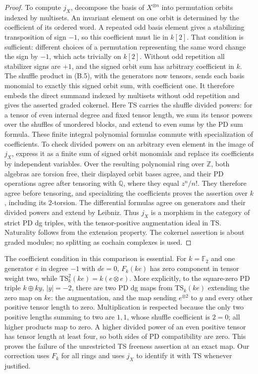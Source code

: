 \begin{proof}
To compute $j_X$, decompose the basis of $X^{\otimes n}$ into permutation
orbits indexed by multisets.  An invariant element on one orbit is
determined by the coefficient of its ordered word.  A repeated odd basis
element gives a stabilizing transposition of sign $-1$, so this coefficient
must lie in $k[2]$.  That condition is sufficient: different choices of a
permutation representing the same word change the sign by $-1$, which
acts trivially on $k[2]$.  Without odd repetition all stabilizer signs are
$+1$, and the signed orbit sum has arbitrary coefficient in $k$.
The shuffle product in \textup{(B.5)}, with the generators now tensors,
sends each basis monomial to exactly this signed orbit sum, with
coefficient one.  It therefore embeds the direct summand indexed by
multisets without odd repetition and gives the asserted graded cokernel.
Here TS carries the shuffle divided powers: for a tensor of even
internal degree and fixed tensor length, we sum its tensor powers over
the shuffles of unordered blocks, and extend to even sums by the PD
sum formula.  These finite integral polynomial formulas commute with
specialization of coefficients.  To check divided powers on an arbitrary
even element in the image of $j_X$, express it as a finite sum of signed
orbit monomials and replace its coefficients by independent variables.
Over the resulting polynomial ring over $\mathbb Z$, both algebras are
torsion free, their displayed orbit bases agree, and their PD operations
agree after tensoring with $\mathbb Q$, where they equal $z^n/n!$.
They therefore agree before tensoring, and specializing the coefficients
proves the assertion over $k$, including its $2$-torsion.
The differential formulas agree on generators and their divided powers
and extend by Leibniz.  Thus $j_X$ is a morphism in the category of
strict PD dg triples, with the tensor-positive augmentation ideal in TS.
Naturality follows from the extension property.
The cokernel assertion is about graded modules; no splitting as
cochain complexes is used.
\end{proof}

The coefficient condition in this comparison is essential.  For
$k=\mathbb F_2$ and one generator $e$ in degree $-1$ with $de=0$,
$F_k(ke)$ has zero component in tensor weight two, while
$\mathrm{TS}_k^2(ke)=k(e\otimes e)$.  More explicitly, to the square-zero
PD triple $k\oplus ky$, $|y|=-2$, there are two PD dg maps from
$\mathrm{TS}_k(ke)$ extending the zero map on $ke$: the augmentation, and
the map sending $e^{\otimes2}$ to $y$ and every other positive tensor
length to zero.  Multiplication is respected because the only two
positive lengths summing to two are $1,1$, whose shuffle coefficient is
$2=0$; all higher products map to zero.  A higher divided power of an
even positive tensor has tensor length at least four, so both sides of
PD compatibility are zero.  This proves the failure of the unrestricted
TS freeness assertion at an exact map.  Our correction uses $F_k$ for all
rings and uses $j_X$ to identify it with TS whenever justified.

